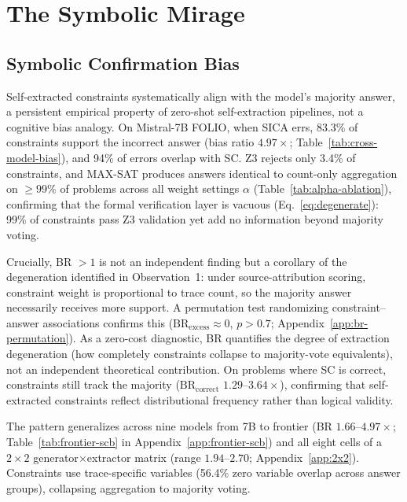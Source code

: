 \section{The Symbolic Mirage}
\label{sec:analysis}

\subsection{Symbolic Confirmation Bias}
\label{sec:confirmation-bias}

 Self-extracted constraints systematically align with the model's majority answer, a persistent empirical property of zero-shot self-extraction pipelines, not a cognitive bias analogy. On Mistral-7B FOLIO, when SICA errs, 83.3\% of constraints support the incorrect answer (bias ratio $4.97\times$; Table~\ref{tab:cross-model-bias}), and 94\% of errors overlap with SC. Z3 rejects only 3.4\% of constraints, and MAX-SAT produces answers identical to count-only aggregation on ${\geq}99\%$ of problems across all weight settings $\alpha$ (Table~\ref{tab:alpha-ablation}), confirming that the formal verification layer is vacuous (Eq.~\ref{eq:degenerate}): 99\% of constraints pass Z3 validation yet add no information beyond majority voting.

 Crucially, BR $> 1$ is not an independent finding but a corollary of the degeneration identified in Observation~1: under source-attribution scoring, constraint weight is proportional to trace count, so the majority answer necessarily receives more support. A permutation test randomizing constraint--answer associations confirms this ($\text{BR}_\text{excess} \approx 0$, $p > 0.7$; Appendix~\ref{app:br-permutation}). As a zero-cost diagnostic, BR quantifies the degree of extraction degeneration (how completely constraints collapse to majority-vote equivalents), not an independent theoretical contribution. On problems where SC is correct, constraints still track the majority ($\text{BR}_\text{correct}$ $1.29$--$3.64\times$), confirming that self-extracted constraints reflect distributional frequency rather than logical validity.

 The pattern generalizes across nine models from 7B to frontier (BR $1.66$--$4.97\times$; Table~\ref{tab:frontier-scb} in Appendix~\ref{app:frontier-scb}) and all eight cells of a $2{\times}2$ generator${\times}$extractor matrix (range $1.94$--$2.70$; Appendix~\ref{app:2x2}). Constraints use trace-specific variables (56.4\% zero variable overlap across answer groups), collapsing aggregation to majority voting.

